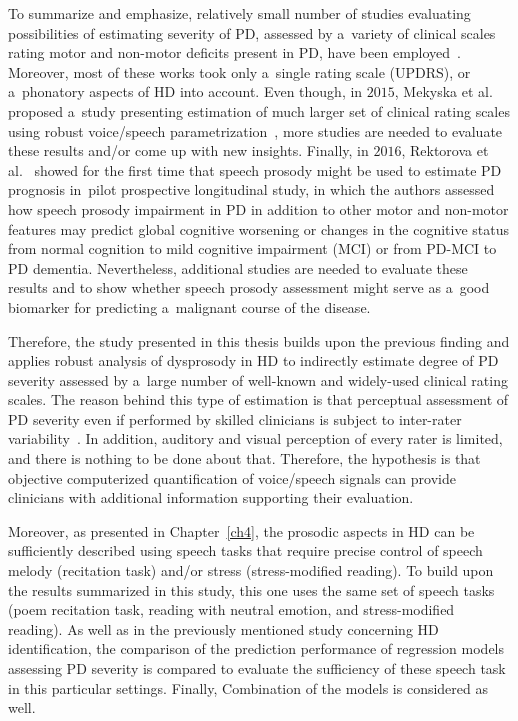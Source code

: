 To summarize and emphasize, relatively small number of studies evaluating possibilities of estimating severity of PD, assessed by a~variety of clinical scales rating motor and non-motor deficits present in PD, have been employed~\cite{Asgari2010, Bayestehtashk2015, Eskidere2012, Peterek2013, Tsanas2010, Tsanas2010a, Tsanas2010b, Smekal2015c, Rektorova2016, Galaz2018a}. Moreover, most of these works took only a~single rating scale (UPDRS), or a~phonatory aspects of HD into account. Even though, in $2015$, Mekyska et al. proposed a~study presenting estimation of much larger set of clinical rating scales using robust voice/speech parametrization~\cite{Mekyska2015}, more studies are needed to evaluate these results and/or come up with new insights. Finally, in $2016$, Rektorova et al.~\cite{Rektorova2016} showed for the first time that speech prosody might be used to estimate PD prognosis in~pilot prospective longitudinal study, in which the authors assessed how speech prosody impairment in PD in addition to other motor and non-motor features may predict global cognitive worsening or changes in the cognitive status from normal cognition to mild cognitive impairment (MCI) or from PD-MCI to PD dementia. Nevertheless, additional studies are needed to evaluate these results and to show whether speech prosody assessment might serve as a~good biomarker for predicting a~malignant course of the disease.

Therefore, the study presented in this thesis builds upon the previous finding and applies robust analysis of dysprosody in HD to indirectly estimate degree of PD severity assessed by a~large number of well-known and widely-used clinical rating scales. The reason behind this type of estimation is that perceptual assessment of PD severity even if performed by skilled clinicians is subject to inter-rater variability~\cite{Ramaker2002, Post2005}. In addition, auditory and visual perception of every rater is limited, and there is nothing to be done about that. Therefore, the hypothesis is that objective computerized quantification of voice/speech signals can provide clinicians with additional information supporting their evaluation. 

Moreover, as presented in Chapter~\ref{ch4}, the prosodic aspects in HD can be sufficiently described using speech tasks that require precise control of speech melody (recitation task) and/or stress (stress-modified reading). To build upon the results summarized in this study, this one uses the same set of speech tasks (poem recitation task, reading with neutral emotion, and stress-modified reading). As well as in the previously mentioned study concerning HD identification, the comparison of the prediction performance of regression models assessing PD severity is compared to evaluate the sufficiency of these speech task in this particular settings. Finally, Combination of the models is considered as well.

